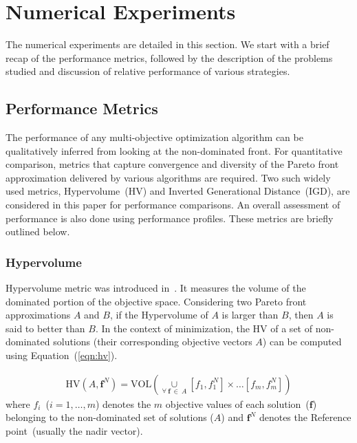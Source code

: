 \section{Numerical Experiments}
\label{sec:numex}

The numerical experiments are detailed in this section. We start with a brief recap of the performance metrics, followed by the description of the problems studied and discussion of relative performance of various strategies. 

\subsection{Performance Metrics}
The performance of any multi-objective optimization algorithm can be qualitatively inferred from looking at the non-dominated front. For quantitative comparison, metrics that capture convergence and diversity of the Pareto front approximation delivered by various algorithms are required. Two such widely used metrics, Hypervolume~(HV) and Inverted Generational Distance~(IGD), are considered in this paper for performance comparisons. An overall assessment of performance is also done using performance profiles. These metrics are briefly outlined below. 

\subsubsection{Hypervolume} Hypervolume metric was introduced in~\cite{zitzler1999multiobjective}. It measures the volume of the dominated portion of the objective space. Considering two Pareto front approximations $A$ and $B$, if the Hypervolume of $A$ is larger than $B$, then $A$ is said to better than $B$. In the context of minimization, the HV of a set of non-dominated solutions (their corresponding objective vectors $A$) can be computed using Equation~(\ref{eqn:hv}).

\begin{equation}
\begin{aligned}
\text{HV}(A,\mathbf{f}^N) = \text{VOL}\left(\underset{\forall~\mathbf{f}~\in~A} \cup \left[f_1,f^{N}_1\right]\times\dots\left[f_m,f^{N}_m\right]\right)
\label{eqn:hv}
\end{aligned}
\end{equation}
where $f_i$~($i = 1,\dots,m$) denotes the $m$ objective values of each solution~($\mathbf{f}$) belonging to the non-dominated set of solutions ($A$) and $\textbf{f}^{N}$ denotes the Reference point~(usually the nadir vector).

